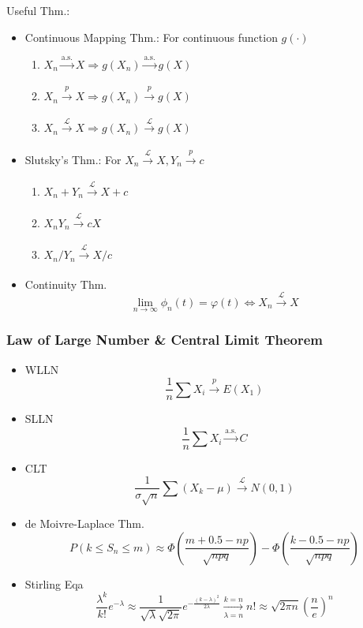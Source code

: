         Useful Thm.:
        \begin{itemize}
            \item Continuous Mapping Thm.: For continuous function $g(\cdot)$
            \begin{enumerate}
                \item $X_n\xrightarrow[]{\text{a.s.}}X\Rightarrow g(X_n)\xrightarrow[]{\text{a.s.}}g(X)$
                \item $X_n\xrightarrow[]{p}X\Rightarrow g(X_n)\xrightarrow[]{p}g(X)$
                \item $X_n\xrightarrow[]{\mathscr{L}}X\Rightarrow g(X_n)\xrightarrow[]{\mathscr{L}}g(X)$
            \end{enumerate}
            \item Slutsky's Thm.: For $X_n\xrightarrow[]{\mathscr{L}}X,Y_n\xrightarrow[]{p}c$
            \begin{enumerate}
                \item $X_n+Y_n\xrightarrow[]{\mathscr{L}}X+c$
                \item $X_nY_n\xrightarrow[]{\mathscr{L}}cX$
                \item $X_n/Y_n\xrightarrow[]{\mathscr{L}}X/c$
            \end{enumerate}
            \item Continuity Thm.
            \[\lim_{n\to\infty}\phi_n(t)=\varphi(t)\Leftrightarrow X_n\xrightarrow[]{\mathscr{L}}X\]
        \end{itemize} 


\subsubsection{Law of Large Number \& Central Limit Theorem}

\begin{itemize}
    \item WLLN
\[
    \frac{1}{n}\sum X_i\xrightarrow[]{p} E(X_1)
\]
\item SLLN
\[
    \frac{1}{n}\sum X_i\xrightarrow[]{\text{a.s.}}  C
\]
\item CLT
\[
    \frac{1}{\sigma\sqrt{n}}\sum(X_k-\mu)\xrightarrow[]{\mathscr{L}} N(0,1)
\]
\item de Moivre-Laplace Thm.
\[
    P(k\leq S_n\leq m)\approx \Phi(\frac{m+0.5-np}{\sqrt{npq}})-\Phi(\frac{k-0.5-np}{\sqrt{npq}})
\]
\item Stirling Eqa
\[
    \frac{\lambda^k}{k!}e^{-\lambda}\approx \frac{1}{\sqrt{\lambda}\sqrt{2\pi}}e^{-\frac{(k-\lambda)^2}{2\lambda}}\xrightarrow[\lambda=n]{k=n}n!\approx\sqrt{2\pi n}(\frac{n}{e})^n
\]

\end{itemize}


